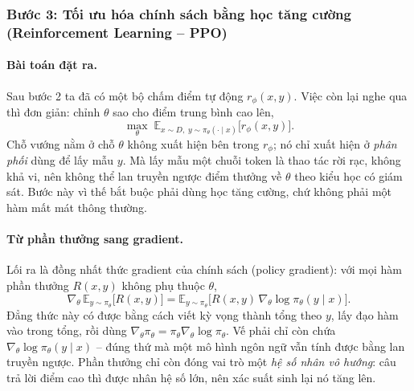 \subsubsection*{Bước 3: Tối ưu hóa chính sách bằng học tăng cường (Reinforcement Learning -- PPO)}

\paragraph{Bài toán đặt ra.}
Sau bước 2 ta đã có một bộ chấm điểm tự động \( r_{\phi}(x,y) \). Việc còn lại nghe qua thì đơn giản: chỉnh \( \theta \) sao cho điểm trung bình cao lên,
\[
    \max_{\theta} \;
    \mathbb{E}_{x \sim D, \; y \sim \pi_{\theta}(\cdot \mid x)}
    \big[ r_{\phi}(x, y) \big].
\]
Chỗ vướng nằm ở chỗ \( \theta \) không xuất hiện bên trong \( r_{\phi} \); nó chỉ xuất hiện ở \emph{phân phối} dùng để lấy mẫu \( y \). Mà lấy mẫu một chuỗi token là thao tác rời rạc, không khả vi, nên không thể lan truyền ngược điểm thưởng về \( \theta \) theo kiểu học có giám sát. Bước này vì thế bắt buộc phải dùng học tăng cường, chứ không phải một hàm mất mát thông thường.

\paragraph{Từ phần thưởng sang gradient.}
Lối ra là đồng nhất thức gradient của chính sách (policy gradient): với mọi hàm phần thưởng \( R(x,y) \) không phụ thuộc \( \theta \),
\[
    \nabla_{\theta}\,
    \mathbb{E}_{y \sim \pi_{\theta}}\big[ R(x,y) \big]
    = \mathbb{E}_{y \sim \pi_{\theta}}\big[
        R(x,y)\, \nabla_{\theta} \log \pi_{\theta}(y \mid x)
    \big].
\]
Đẳng thức này có được bằng cách viết kỳ vọng thành tổng theo \( y \), lấy đạo hàm vào trong tổng, rồi dùng \( \nabla_{\theta} \pi_{\theta} = \pi_{\theta} \nabla_{\theta} \log \pi_{\theta} \). Vế phải chỉ còn chứa \( \nabla_{\theta} \log \pi_{\theta}(y \mid x) \) -- đúng thứ mà một mô hình ngôn ngữ vẫn tính được bằng lan truyền ngược. Phần thưởng chỉ còn đóng vai trò một \emph{hệ số nhân vô hướng}: câu trả lời điểm cao thì được nhân hệ số lớn, nên xác suất sinh lại nó tăng lên.

